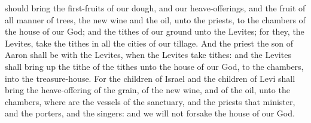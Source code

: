 should bring the first-fruits of our dough, and our heave-offerings, and the fruit of all manner of trees, the new wine and the oil, unto the priests, to the chambers of the house of our God; and the tithes of our ground unto the Levites; for they, the Levites, take the tithes in all the cities of our tillage. And the priest the son of Aaron shall be with the Levites, when the Levites take tithes: and the Levites shall bring up the tithe of the tithes unto the house of our God, to the chambers, into the treasure-house. For the children of Israel and the children of Levi shall bring the heave-offering of the grain, of the new wine, and of the oil, unto the chambers, where are the vessels of the sanctuary, and the priests that minister, and the porters, and the singers: and we will not forsake the house of our God. 

